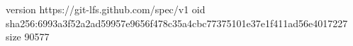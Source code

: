 version https://git-lfs.github.com/spec/v1
oid sha256:6993a3f52a2ad59957e9656f478c35a4cbc77375101e37e1f411ad56e4017227
size 90577
